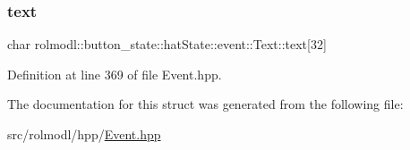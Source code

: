 \subsubsection{\texorpdfstring{text}{text}}
{\footnotesize\ttfamily char rolmodl\+::button\+\_\+state\+::hat\+State\+::event\+::\+Text\+::text\mbox{[}32\mbox{]}}



Definition at line 369 of file Event.\+hpp.



The documentation for this struct was generated from the following file\+:\begin{DoxyCompactItemize}
\item 
src/rolmodl/hpp/\mbox{\hyperlink{_event_8hpp}{Event.\+hpp}}\end{DoxyCompactItemize}
